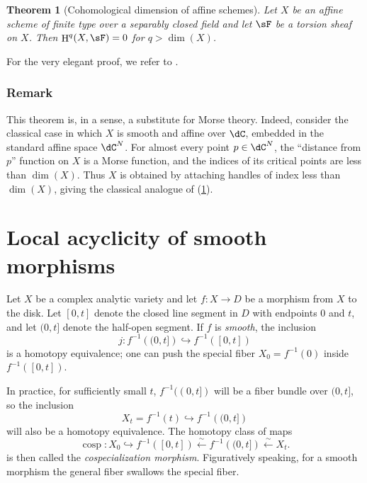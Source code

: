 \documentclass[12pt,oneside,english]{smfbook}
\DeclareMathOperator{\cosp}{cosp}
\DeclareMathOperator{\h}{H}
\newtheorem{theorem}[subsubsection]{Theorem}
\begin{document}
\begin{theorem}[Cohomological dimension of affine schemes]\label{I:4-6-4}
Let $X$ be an affine scheme of finite type over a separably closed field and let $\sF$ be a torsion sheaf on $X$. Then $\h^q(X,\sF)=0$ for $q>\dim(X)$.
\end{theorem}

For the very elegant proof, we refer to \cite[XIV, \S\S 2--3]{sga4}.

\subsubsection{Remark}\label{I:4-6-5}

This theorem is, in a sense, a substitute for Morse theory. Indeed, consider the classical case in which $X$ is smooth and affine over $\dC$, embedded in the standard affine space $\dC^N$. For almost every point $p\in\dC^N$, the ``distance from $p$'' function on $X$ is a Morse function, and the indices of its critical points are less than $\dim(X)$. Thus $X$ is obtained by attaching handles of index less than $\dim(X)$, giving the classical analogue of (\ref{I:4-6-4}).

\section{Local acyclicity of smooth morphisms}\label{I:5}

Let $X$ be a complex analytic variety and let $f:X\to D$ be a morphism from $X$ to the disk. Let $[0,t]$ denote the closed line segment in $D$ with endpoints $0$ and $t$, and let $(0,t]$ denote the half-open segment. If $f$ is \emph{smooth}, the inclusion
\[
  j : f^{-1}\left((0,t]\right) \hookrightarrow f^{-1}\left([0,t]\right)
\]
is a homotopy equivalence; one can push the special fiber $X_0=f^{-1}(0)$ inside $f^{-1}([0,t])$.

In practice, for sufficiently small $t$, $f^{-1}((0,t])$ will be a fiber bundle over $(0,t]$, so the inclusion
\[
  X_t = f^{-1}(t) \hookrightarrow f^{-1}\left((0,t]\right)
\]
will also be a homotopy equivalence. The homotopy class of maps
\[
  \cosp : X_0 \hookrightarrow f^{-1}\left([0,t]\right) \xleftarrow\sim f^{-1}\left((0,t]\right) \xleftarrow\sim X_t \text{.}
\]
is then called the \emph{cospecialization morphism}. Figuratively speaking, for a smooth morphism the general fiber swallows the special fiber.
\end{document}
